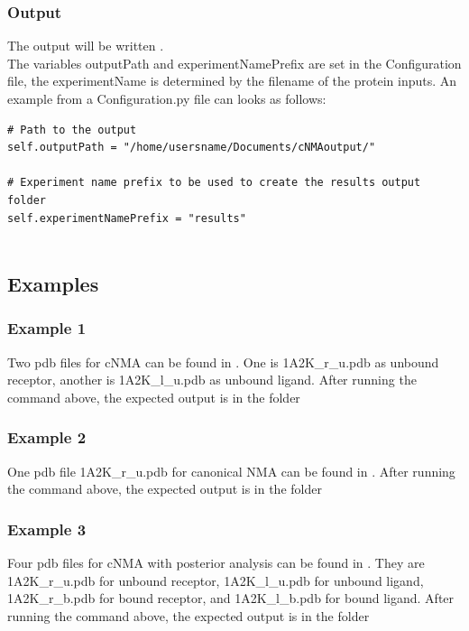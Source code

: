 \documentclass[11pt]{article}
\begin{document}
\subsubsection{Output}
The output will be written . \\
The variables outputPath and experimentNamePrefix are set in the Configuration file, the experimentName is determined by the filename of the protein inputs. An example from a Configuration.py file can looks as follows:

\begin{verbatim}
# Path to the output
self.outputPath = "/home/usersname/Documents/cNMAoutput/"

# Experiment name prefix to be used to create the results output folder
self.experimentNamePrefix = "results"
		
\end{verbatim}

\subsection{Examples}
\subsubsection{Example 1}

Two pdb files for cNMA can be found in . One is 1A2K\_r\_u.pdb as unbound receptor, another is 1A2K\_l\_u.pdb as unbound ligand. After running the command above, the expected output is in the folder 

\subsubsection{Example 2}

One pdb file 1A2K\_r\_u.pdb for canonical NMA can be found in . After running the command above, the expected output is in the folder 

\subsubsection{Example 3}

Four pdb files for cNMA with posterior analysis can be found in . They are 1A2K\_r\_u.pdb for unbound receptor, 1A2K\_l\_u.pdb for unbound ligand, 1A2K\_r\_b.pdb for bound receptor, and 1A2K\_l\_b.pdb for bound ligand. After running the command above, the expected output is in the folder 
\end{document}
